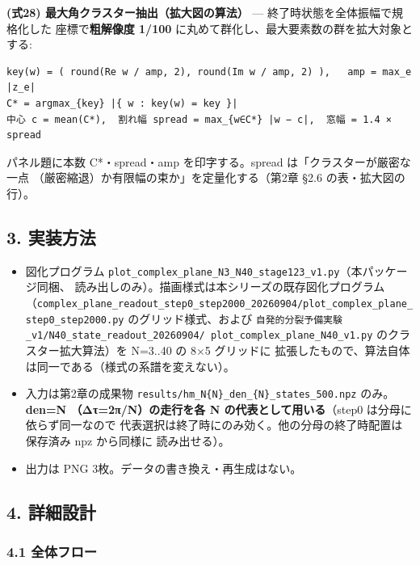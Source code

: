 \documentclass[
  a4paper,
]{ltjsarticle}
\providecommand{\tightlist}{%
  \setlength{\itemsep}{0pt}\setlength{\parskip}{0pt}}
\begin{document}
\textbf{(式28) 最大角クラスター抽出（拡大図の算法）} ---
終了時状態を全体振幅で規格化した 座標で\textbf{粗解像度 1/100}
に丸めて群化し、最大要素数の群を拡大対象とする:

\begin{verbatim}
key(w) = ( round(Re w / amp, 2), round(Im w / amp, 2) ),   amp = max_e |z_e|
C* = argmax_{key} |{ w : key(w) = key }|
中心 c = mean(C*),  割れ幅 spread = max_{w∈C*} |w − c|,  窓幅 = 1.4 × spread
\end{verbatim}

パネル題に本数 \textbar C*\textbar・spread・amp を印字する。spread
は「クラスターが厳密な一点
（厳密縮退）か有限幅の束か」を定量化する（第2章 §2.6
の表・拡大図の行）。

\subsection{3. 実装方法}\label{ux5b9fux88c5ux65b9ux6cd5}

\begin{itemize}
\tightlist
\item
  図化プログラム
  \texttt{plot\_complex\_plane\_N3\_N40\_stage123\_v1.py}（本パッケージ同梱、
  読み出しのみ）。描画様式は本シリーズの既存図化プログラム
  （\texttt{complex\_plane\_readout\_step0\_step2000\_20260904/plot\_complex\_plane\_step0\_step2000.py}
  のグリッド様式、および
  \texttt{自発的分裂予備実験\_v1/N40\_state\_readout\_20260904/\ plot\_complex\_plane\_N40\_v1.py}
  のクラスター拡大算法）を N=3..40 の 8×5 グリッドに
  拡張したもので、算法自体は同一である（様式の系譜を変えない）。
\item
  入力は第2章の成果物
  \texttt{results/hm\_N\{N\}\_den\_\{N\}\_states\_500.npz}
  のみ。\textbf{den=N （Δτ=2π/N）の走行を各 N の代表として用いる}（step0
  は分母に依らず同一なので
  代表選択は終了時にのみ効く。他の分母の終了時配置は保存済み npz
  から同様に 読み出せる）。
\item
  出力は PNG 3枚。データの書き換え・再生成はない。
\end{itemize}

\subsection{4. 詳細設計}\label{ux8a73ux7d30ux8a2dux8a08}

\subsubsection{4.1 全体フロー}\label{ux5168ux4f53ux30d5ux30edux30fc}
\end{document}

